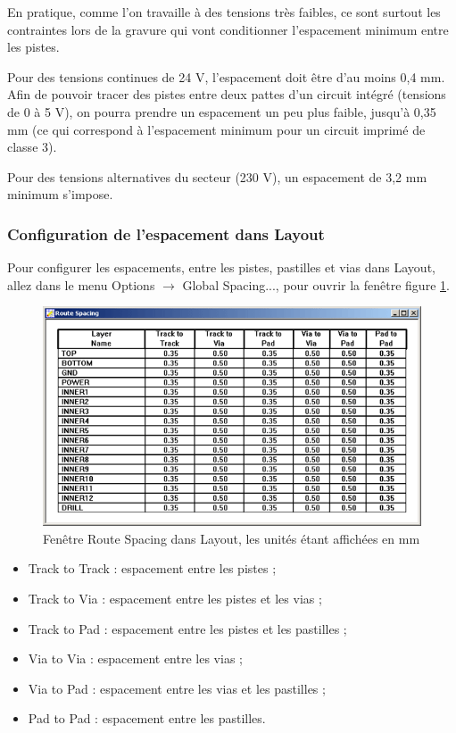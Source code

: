 \documentclass[a4paper]{article}
\begin{document}
En pratique, comme l'on travaille à des tensions très faibles, ce sont surtout les contraintes lors de la gravure qui vont conditionner l'espacement minimum entre les pistes. 

Pour des tensions continues de 24 V, l'espacement doit être d'au moins 0,4 mm. Afin de pouvoir tracer des pistes entre deux pattes d'un circuit intégré (tensions de 0 à 5 V), on pourra prendre un espacement un peu plus faible, jusqu'à 0,35 mm (ce qui correspond à l'espacement minimum pour un circuit imprimé de classe 3).

Pour des tensions alternatives du secteur (230 V), un espacement de 3,2 mm minimum s'impose.

\subsubsection{Configuration de l'espacement dans Layout}

Pour configurer les espacements, entre les pistes, pastilles et vias dans Layout, allez dans le menu \og{}Options\fg{} $\rightarrow$ \og{}Global Spacing...\fg{}, pour ouvrir la fenêtre figure \ref{Route_Spacing_Layout}.

\begin{figure}[H]
	\centering
	\includegraphics[scale=0.75]{Images/Route_Spacing_Layout.png}
	\caption{Fenêtre \og{}Route Spacing\fg{} dans Layout, les unités étant affichées en mm
		\label{Route_Spacing_Layout}}
\end{figure}

\begin{itemize}
	\item \og{}Track to Track\fg{} : espacement entre les pistes ;
	\item \og{}Track to Via\fg{} : espacement entre les pistes et les vias ;
	\item \og{}Track to Pad\fg{} : espacement entre les pistes et les pastilles ;
	\item \og{}Via to Via\fg{} : espacement entre les vias ;
	\item \og{}Via to Pad\fg{} : espacement entre les vias et les pastilles ;
	\item \og{}Pad to Pad\fg{} : espacement entre les pastilles.
\end{itemize}
\end{document}
